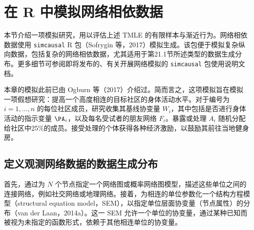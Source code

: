 \section{在 R 中模拟网络相依数据}

本节介绍一项模拟研究，用以评估上述 TMLE 的有限样本与渐近行为。网络相依数据使用 \texttt{simcausal} R 包（Sofrygin 等，2017）模拟生成。该包便于模拟复杂纵向数据，包括复杂的网络相依数据，尤其适用于第21.1节所述类型的数据生成分布。更多细节可参阅即将发布的、有关开展网络模拟的 \texttt{simcausal} 包使用说明文档。

本章的模拟此前已由 Ogburn 等（2017）介绍过。简而言之，这项模拟旨在模拟一项假想研究：提高一个高度相连的目标社区的身体活动水平。对于编号为 $i=1,\ldots,n$ 的每位社区成员，研究收集其基线协变量 $W_i$，其中包括是否进行身体活动的指示变量 $\PA_i$，以及每名受试者的朋友网络 $F_i$。暴露或处理 $A_i$ 随机分配给社区中25\%的成员。接受处理的个体获得各种经济激励，以鼓励其前往当地健身房。

\subsection{定义观测网络数据的数据生成分布}

首先，通过为 $N$ 个节点指定一个网络图或概率网络图模型，描述这些单位之间的连接网络，例如社交网络或地理网络。接着，为相连的单位参数化一个结构方程模型（structural equation model，SEM），以指定单位层面协变量（节点属性）的分布（van der Laan，2014a）。这一 SEM 允许一个单位的协变量，通过某种已知而被视为未指定的函数形式，依赖于其他相连单位的协变量。

